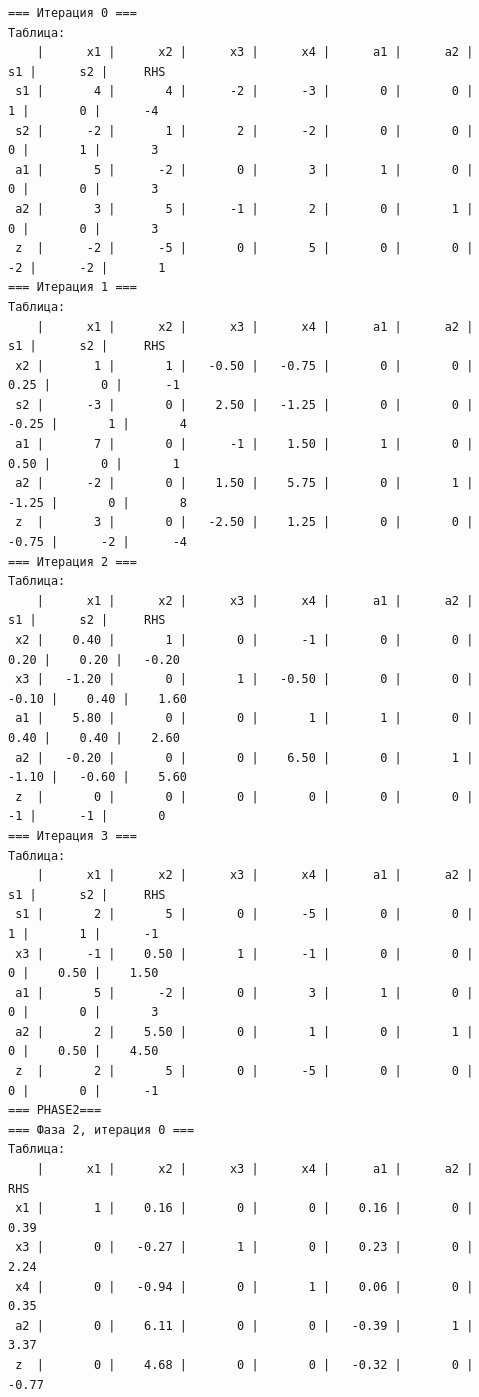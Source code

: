 \documentclass[a4paper,12pt]{article}
\begin{document}
\begin{verbatim}
=== Итерация 0 ===
Таблица:
    |      x1 |      x2 |      x3 |      x4 |      a1 |      a2 |      s1 |      s2 |     RHS
 s1 |       4 |       4 |      -2 |      -3 |       0 |       0 |       1 |       0 |      -4
 s2 |      -2 |       1 |       2 |      -2 |       0 |       0 |       0 |       1 |       3
 a1 |       5 |      -2 |       0 |       3 |       1 |       0 |       0 |       0 |       3
 a2 |       3 |       5 |      -1 |       2 |       0 |       1 |       0 |       0 |       3
 z  |      -2 |      -5 |       0 |       5 |       0 |       0 |      -2 |      -2 |       1
=== Итерация 1 ===
Таблица:
    |      x1 |      x2 |      x3 |      x4 |      a1 |      a2 |      s1 |      s2 |     RHS
 x2 |       1 |       1 |   -0.50 |   -0.75 |       0 |       0 |    0.25 |       0 |      -1
 s2 |      -3 |       0 |    2.50 |   -1.25 |       0 |       0 |   -0.25 |       1 |       4
 a1 |       7 |       0 |      -1 |    1.50 |       1 |       0 |    0.50 |       0 |       1
 a2 |      -2 |       0 |    1.50 |    5.75 |       0 |       1 |   -1.25 |       0 |       8
 z  |       3 |       0 |   -2.50 |    1.25 |       0 |       0 |   -0.75 |      -2 |      -4
=== Итерация 2 ===
Таблица:
    |      x1 |      x2 |      x3 |      x4 |      a1 |      a2 |      s1 |      s2 |     RHS
 x2 |    0.40 |       1 |       0 |      -1 |       0 |       0 |    0.20 |    0.20 |   -0.20
 x3 |   -1.20 |       0 |       1 |   -0.50 |       0 |       0 |   -0.10 |    0.40 |    1.60
 a1 |    5.80 |       0 |       0 |       1 |       1 |       0 |    0.40 |    0.40 |    2.60
 a2 |   -0.20 |       0 |       0 |    6.50 |       0 |       1 |   -1.10 |   -0.60 |    5.60
 z  |       0 |       0 |       0 |       0 |       0 |       0 |      -1 |      -1 |       0
=== Итерация 3 ===
Таблица:
    |      x1 |      x2 |      x3 |      x4 |      a1 |      a2 |      s1 |      s2 |     RHS
 s1 |       2 |       5 |       0 |      -5 |       0 |       0 |       1 |       1 |      -1
 x3 |      -1 |    0.50 |       1 |      -1 |       0 |       0 |       0 |    0.50 |    1.50
 a1 |       5 |      -2 |       0 |       3 |       1 |       0 |       0 |       0 |       3
 a2 |       2 |    5.50 |       0 |       1 |       0 |       1 |       0 |    0.50 |    4.50
 z  |       2 |       5 |       0 |      -5 |       0 |       0 |       0 |       0 |      -1
=== PHASE2===
=== Фаза 2, итерация 0 ===
Таблица:
    |      x1 |      x2 |      x3 |      x4 |      a1 |      a2 |     RHS
 x1 |       1 |    0.16 |       0 |       0 |    0.16 |       0 |    0.39
 x3 |       0 |   -0.27 |       1 |       0 |    0.23 |       0 |    2.24
 x4 |       0 |   -0.94 |       0 |       1 |    0.06 |       0 |    0.35
 a2 |       0 |    6.11 |       0 |       0 |   -0.39 |       1 |    3.37
 z  |       0 |    4.68 |       0 |       0 |   -0.32 |       0 |   -0.77
\end{verbatim}
\end{document}
